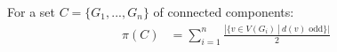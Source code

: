 \documentclass[a4paper]{article}
\begin{document}
	\newpage
	\begin{solution}{6}
	\end{solution} 
	\newpage
	\begin{solution}{7}
		For a set $C = \{G_1, ..., G_n\}$ of connected components:\\
		\begin{align}
			\pi(C)&= \sum_{i = 1}^n \frac{|\{v \in V(G_i)\ |\ d(v) \text{ odd}\}|}{2}&
		\end{align}
	\end{solution} 
	\newpage
	\begin{solution}{8}
		
	\end{solution}
	
\end{document}
